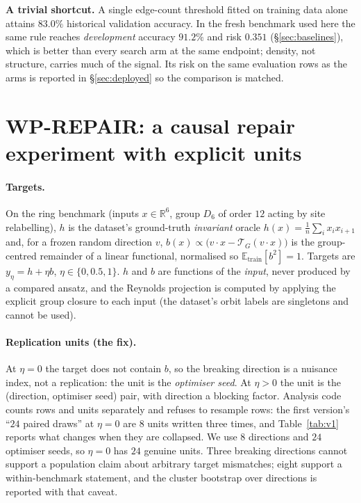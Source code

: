 \documentclass{neurips_2024}
\newcommand{\Tg}{\mathcal{T}_G}
\begin{document}
\textbf{A trivial shortcut.} A single edge-count threshold fitted on training data alone
attains $83.0\%$ historical validation accuracy. In the fresh benchmark used here the same
rule reaches \emph{development} accuracy $91.2\%$ and risk $0.351$ (\S\ref{sec:baselines}),
which is better than every search arm at the same endpoint; density, not structure, carries
much of the signal. Its risk on the same evaluation rows as the arms is reported in
\S\ref{sec:deployed} so the comparison is matched.

\section{WP-REPAIR: a causal repair experiment with explicit units}
\label{sec:repair}

\paragraph{Targets.} On the ring benchmark (inputs $x\in\mathbb{R}^{6}$, group $D_6$ of
order $12$ acting by site relabelling), $h$ is the dataset's ground-truth \emph{invariant}
oracle $h(x)=\frac1n\sum_i x_i x_{i+1}$ and, for a frozen random direction $v$,
$b(x)\propto \bigl(v\!\cdot\!x-\Tg(v\!\cdot\!x)\bigr)$ is the group-centred remainder of a
linear functional, normalised so $\mathbb{E}_{\text{train}}[b^2]=1$. Targets are
$y_\eta=h+\eta b$, $\eta\in\{0,0.5,1\}$. $h$ and $b$ are functions of the \emph{input},
never produced by a compared ansatz, and the Reynolds projection is computed by applying
the explicit group closure to each input (the dataset's orbit labels are singletons and
cannot be used).

\paragraph{Replication units (the fix).} At $\eta=0$ the target does not contain $b$, so
the breaking direction is a nuisance index, not a replication: the unit is the
\emph{optimiser seed}. At $\eta>0$ the unit is the (direction, optimiser seed) pair, with
direction a blocking factor. Analysis code counts rows and units separately and refuses to
resample rows: the first version's ``$24$ paired draws'' at $\eta=0$ are $8$ units written
three times, and Table~\ref{tab:v1} reports what changes when they are collapsed. We use
$8$ directions and $24$ optimiser seeds, so $\eta=0$ has $24$ genuine units. Three
breaking directions cannot support a population claim about arbitrary target mismatches;
eight support a within-benchmark statement, and the cluster bootstrap over directions is
reported with that caveat.
\end{document}
